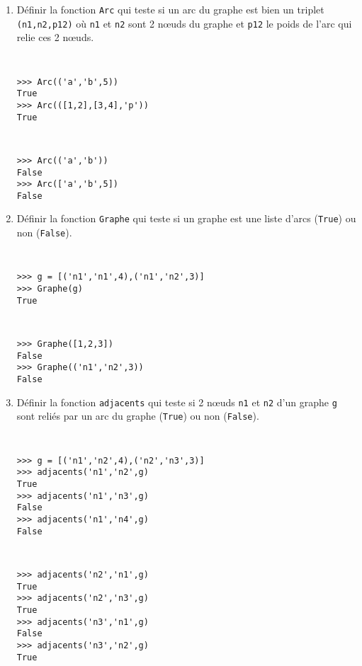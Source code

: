 \begin{question}\mbox{}
\begin{enumerate}
\item Définir la fonction \texttt{Arc} qui teste si un arc du
	graphe est bien un triplet \texttt{(n1,n2,p12)} où
	\texttt{n1} et \texttt{n2} sont 2 n\oe uds du graphe et
	\texttt{p12} le poids de l'arc qui relie ces 2 n\oe uds.
	
\noindent\begin{minipage}[t]{6cm}\tt\footnotesize
\begin{Verbatim}
>>> Arc(('a','b',5))
True
>>> Arc(([1,2],[3,4],'p'))
True
\end{Verbatim}
\end{minipage}
\hfill
\begin{minipage}[t]{6cm}\tt\footnotesize
\begin{Verbatim}
>>> Arc(('a','b'))
False
>>> Arc(['a','b',5])
False
\end{Verbatim}
\end{minipage}
\vspace*{2mm}
	
\item Définir la fonction \texttt{Graphe} qui teste si un graphe
	est une liste d'arcs (\texttt{True}) ou non (\texttt{False}).

\noindent\begin{minipage}[t]{6cm}\tt\footnotesize
\begin{Verbatim}
>>> g = [('n1','n1',4),('n1','n2',3)]
>>> Graphe(g)
True
\end{Verbatim}
\end{minipage}
\hfill
\begin{minipage}[t]{6cm}\tt\footnotesize
\begin{Verbatim}
>>> Graphe([1,2,3])
False
>>> Graphe(('n1','n2',3))
False
\end{Verbatim}
\end{minipage}
\vspace*{2mm}
	
\item Définir la fonction \texttt{adjacents} qui teste si 2 n\oe uds \texttt{n1}
	et \texttt{n2} d'un graphe \texttt{g} sont reliés par un arc du graphe (\texttt{True})
	ou non (\texttt{False}).

\noindent\begin{minipage}[t]{6cm}\tt\footnotesize
\begin{Verbatim}
>>> g = [('n1','n2',4),('n2','n3',3)]
>>> adjacents('n1','n2',g)
True
>>> adjacents('n1','n3',g)
False
>>> adjacents('n1','n4',g)
False
\end{Verbatim}
\end{minipage}
\hfill
\begin{minipage}[t]{6cm}\tt\footnotesize
\begin{Verbatim}
>>> adjacents('n2','n1',g)
True
>>> adjacents('n2','n3',g)
True
>>> adjacents('n3','n1',g)
False
>>> adjacents('n3','n2',g)
True
\end{Verbatim}
\end{minipage}
\vspace*{2mm}
	

\end{enumerate}
\end{question}
